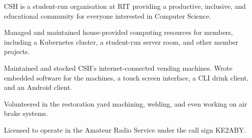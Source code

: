 \smallskip


\medskip


\smallskip
\smallskip


\medskip
{}

CSH is a student-run organisation at RIT providing a productive, inclusive, and educational community for everyone interested in Computer Science.

\medskip

Managed and maintained house-provided computing resources for members, including a Kubernetes cluster, a student-run server room, and other member projects.

\medskip

Maintained and stocked CSH's internet-connected vending machines.
Wrote embedded software for the machines, a touch screen interface, a CLI drink client, and an Android client.

\divider

Volunteered in the restoration yard machining, welding, and even working on air brake systems.

\divider

Licensed to operate in the Amateur Radio Service under the call sign KE2ABY.
